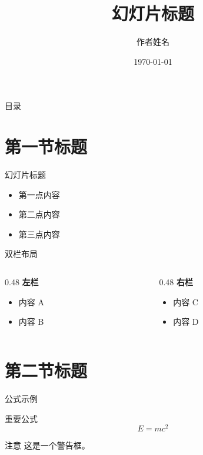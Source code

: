 \documentclass[
    aspectratio=169,
    fontset=windows,
]{ctexbeamer}
\title{幻灯片标题}
\author{作者姓名}
\date{\today}
\begin{document}
\maketitle

\begin{frame}{目录}
  \tableofcontents[hideallsubsections]
\end{frame}

\section{第一节标题}

\begin{frame}{幻灯片标题}
  \begin{itemize}
    \item 第一点内容
    \item 第二点内容
    \item 第三点内容
  \end{itemize}
\end{frame}

\begin{frame}{双栏布局}
  \begin{columns}[T]
    \begin{column}{0.48\textwidth}
      \textbf{左栏}
      \begin{itemize}
        \item 内容 A
        \item 内容 B
      \end{itemize}
    \end{column}
    \begin{column}{0.48\textwidth}
      \textbf{右栏}
      \begin{itemize}
        \item 内容 C
        \item 内容 D
      \end{itemize}
    \end{column}
  \end{columns}
\end{frame}

\section{第二节标题}

\begin{frame}{公式示例}
  \begin{block}{重要公式}
    \begin{equation}
      E = mc^2
    \end{equation}
  \end{block}

  \begin{alertblock}{注意}
    这是一个警告框。
  \end{alertblock}
\end{frame}

\maketitle
\end{document}
